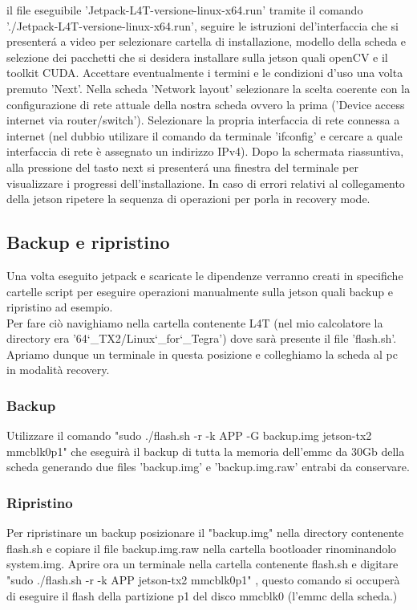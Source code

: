 \documentclass[a4paper]{article}
\begin{document}
il file eseguibile 'Jetpack-L4T-versione-linux-x64.run' tramite il comando './Jetpack-L4T-versione-linux-x64.run', seguire le istruzioni del'interfaccia che si presenterá a video
per selezionare cartella di installazione, modello della scheda e selezione dei pacchetti che si desidera installare sulla jetson quali openCV e il toolkit CUDA.
Accettare eventualmente i termini e le condizioni d'uso una volta premuto 'Next'.
Nella scheda 'Network layout' selezionare la scelta coerente con la configurazione di rete attuale della nostra scheda ovvero la prima ('Device access internet via router/switch').
Selezionare la propria interfaccia di rete connessa a internet (nel dubbio utilizare il comando da terminale 'ifconfig' e cercare a quale interfaccia di rete è assegnato un indirizzo IPv4).
Dopo la schermata riassuntiva, alla pressione del tasto next si presenterá una finestra del terminale per visualizzare i progressi dell'installazione.
In caso di errori relativi al collegamento della jetson ripetere la sequenza di operazioni per porla in recovery mode.


\subsection{Backup e ripristino}
Una volta eseguito jetpack e scaricate le dipendenze verranno creati in specifiche cartelle script per eseguire operazioni manualmente sulla jetson
quali backup e ripristino ad esempio.\\
Per fare ciò navighiamo nella cartella contenente L4T (nel mio calcolatore la directory era '64\char`_TX2/Linux\char`_for\char`_Tegra') dove sarà presente il file 'flash.sh'.\\
Apriamo dunque un terminale in questa posizione e colleghiamo la scheda al pc in modalità recovery.

\subsubsection{Backup}
Utilizzare il comando "sudo ./flash.sh -r -k APP -G backup.img jetson-tx2 mmcblk0p1" che eseguirà il backup di tutta la memoria dell'emmc da 30Gb della scheda
generando due files 'backup.img' e 'backup.img.raw' entrabi da conservare.

\subsubsection{Ripristino}
Per ripristinare un backup posizionare il "backup.img" nella directory contenente flash.sh e copiare il file backup.img.raw nella cartella bootloader rinominandolo system.img.
Aprire ora un terminale nella cartella contenente flash.sh e digitare "sudo ./flash.sh -r -k APP jetson-tx2 mmcblk0p1" , questo comando si occuperà di eseguire il flash della partizione p1 del disco mmcblk0 (l'emmc della scheda.)\\
\end{document}
